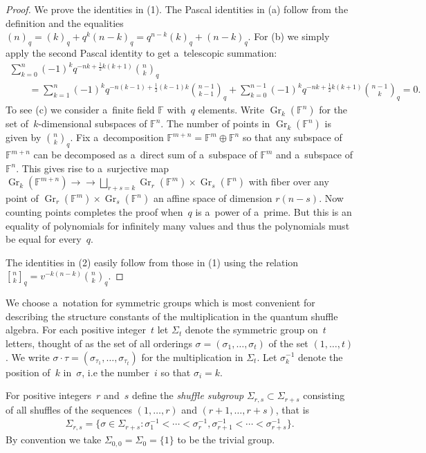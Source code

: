 \documentclass[11pt]{article}
\newcommand{\onto}{\to\!\!\!\!\!\to}
\numberwithin{equation}{section}
\begin{document}
\begin{proof}
We prove the identities in (1).
The Pascal identities in (a) follow from the def\/inition and the equalities
$(n)_q=(k)_q+q^k(n-k)_q=q^{n-k}(k)_q+(n-k)_q$.
For (b) we simply apply the second Pascal identity to get a~telescopic summation:
\begin{gather*}
\sum\limits_{k=0}^n (-1)^k q^{-nk+\frac{1}{2} k(k+1)}{n\choose k}_q
\\
\qquad
=\sum\limits_{k=1}^n (-1)^k
q^{-n(k-1)+\frac{1}{2}(k-1)k}{n-1\choose k-1}_q+\sum\limits_{k=0}^{n-1} (-1)^k q^{-nk+\frac{1}{2} k(k+1)}{n-1\choose
k}_q=0.
\end{gather*}
To see (c) we consider a~f\/inite f\/ield $\mathbb{F}$ with~$q$ elements.
Write $\operatorname{Gr}_k(\mathbb{F}^n)$ for the set of~$k$-dimensional subspaces of $\mathbb{F}^n$.
The number of points in $\operatorname{Gr}_k(\mathbb{F}^n)$ is given by ${n\choose k}_q$.
Fix a~decomposition $\mathbb{F}^{m+n}=\mathbb{F}^m\oplus\mathbb{F}^n$ so that any subspace of $\mathbb{F}^{m+n}$ can be
decomposed as a~direct sum of a~subspace of $\mathbb{F}^m$ and a~subspace of $\mathbb{F}^n$.
This gives rise to a~surjective map $\operatorname{Gr}_k(\mathbb{F}^{m+n})\onto \bigsqcup\limits_{r+s=k}\operatorname{Gr}_r(\mathbb{F}^m)\times\operatorname{Gr}_s(\mathbb{F}^n)$ with f\/iber over any point
of $\operatorname{Gr}_r(\mathbb{F}^m)\times\operatorname{Gr}_s(\mathbb{F}^n)$ an af\/f\/ine space of dimension $r(n-s)$.
Now counting points completes the proof when~$q$ is a~power of a~prime.
But this is an equality of polynomials for inf\/initely many values and thus the polynomials must be equal for every~$q$.

The identities in (2) easily follow from those in (1) using the relation ${n\brack k}_q=v^{-k(n-k)}{n\choose k}_q$.
\end{proof}

We choose a~notation for symmetric groups which is most convenient for describing the structure constants of the
multiplication in the quantum shuf\/f\/le algebra.
For each positive integer~$t$ let $\Sigma_t$ denote the symmetric group on~$t$ letters, thought of as the set of all
orderings $\sigma=(\sigma_1,\ldots,\sigma_t)$ of the set $(1,\ldots,t)$.
We write $\sigma\cdot\tau=(\sigma_{\tau_1},\ldots,\sigma_{\tau_t})$ for the multiplication in $\Sigma_t$.
Let $\sigma^{-1}_k$ denote the position of~$k$ in~$\sigma$, i.e the number~$i$ so that $\sigma_i=k$.

For positive integers~$r$ and~$s$ def\/ine the \emph{shuffle subgroup} $\Sigma_{r,s}\subset\Sigma_{r+s}$ consisting of all
shuf\/f\/les of the sequences $(1,\ldots,r)$ and $(r+1,\ldots,r+s)$, that is
\begin{gather*}
\Sigma_{r,s}=\big\{\sigma\in\Sigma_{r+s}: \sigma^{-1}_1<\cdots<\sigma^{-1}_r, \sigma^{-1}_{r+1}<\cdots<\sigma^{-1}_{r+s}\big\}.
\end{gather*}
By convention we take $\Sigma_{0,0}=\Sigma_0=\{1\}$ to be the trivial group.
\end{document}
